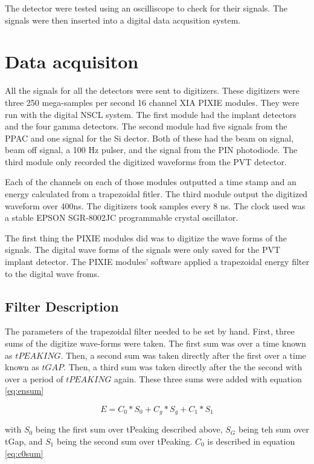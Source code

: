 The detector were tested using an oscilliscope to check for their signals.
The signals were then inserted into a digital data acqusition system.

\section{Data acquisiton}

All the signals for all the detectors were sent to digitizers.
These digitizers were three 250 mega-samples per second 16 channel XIA PIXIE modules. 
They were run with the digital NSCL system.
The first module had the implant detectors and the four gamma detectors. 
The second module had five signals from the PPAC and one signal for the Si dector. 
Both of these had the beam on signal, beam off signal, a 100 Hz pulser, and the signal from the PIN photodiode. 
The third module only recorded the digitized waveforms from the PVT detector.

Each of the channels on each of those modules outputted a time stamp and an energy calculated from a trapezoidal fitler.
The third module output the digitized waveform over 400ns.
The digitizers took samples every 8 ns.
The clock used was a stable EPSON SGR-8002JC programmable crystal oscillator.

The first thing the PIXIE modules did was to digitize the wave forms of the signals.
The digital wave forms of the signals were only saved for the PVT implant detector.
The PIXIE modules' software applied a trapezoidal energy filter to the digital wave froms.

\subsection{Filter Description}
The parameters of the trapezoidal filter needed to be set by hand.
First, three sums of the digitize wave-forms were taken.
The first sum was over a time known as $tPEAKING$.
Then, a second sum was taken directly after the first over a time known as $tGAP$.
Then, a third sum was taken directly after the the second with over a period of $tPEAKING$ again.
These three sums were added with equation \ref{eq:ensum}

\begin{equation}
	E = C_{0} * S_{0} + C_{g} * S_{g} + C_{1} * S_{1} 
	\label{eq:ensum}
\end{equation} 

with $S_{0}$ being the first sum over tPeaking described above, $S_{G}$ being teh sum over tGap, and $S_{1}$ being the second sum over tPeaking.
$C_{0}$ is described in equation \ref{eq:c0sum}

